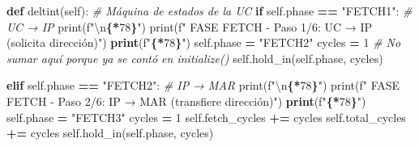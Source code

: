 \documentclass[12pt,oneside]{templates/unerthesis}
\newenvironment{Shaded}{\begin{snugshade}}{\end{snugshade}}
\newcommand{\BuiltInTok}[1]{#1}
\newcommand{\CharTok}[1]{\textcolor[rgb]{0.31,0.60,0.02}{#1}}
\newcommand{\CommentTok}[1]{\textcolor[rgb]{0.56,0.35,0.01}{\textit{#1}}}
\newcommand{\ControlFlowTok}[1]{\textcolor[rgb]{0.13,0.29,0.53}{\textbf{#1}}}
\newcommand{\DecValTok}[1]{\textcolor[rgb]{0.00,0.00,0.81}{#1}}
\newcommand{\ErrorTok}[1]{\textcolor[rgb]{0.64,0.00,0.00}{\textbf{#1}}}
\newcommand{\KeywordTok}[1]{\textcolor[rgb]{0.13,0.29,0.53}{\textbf{#1}}}
\newcommand{\NormalTok}[1]{#1}
\newcommand{\OperatorTok}[1]{\textcolor[rgb]{0.81,0.36,0.00}{\textbf{#1}}}
\newcommand{\SpecialCharTok}[1]{\textcolor[rgb]{0.81,0.36,0.00}{\textbf{#1}}}
\newcommand{\SpecialStringTok}[1]{\textcolor[rgb]{0.31,0.60,0.02}{#1}}
\newcommand{\StringTok}[1]{\textcolor[rgb]{0.31,0.60,0.02}{#1}}
\newcommand{\VariableTok}[1]{\textcolor[rgb]{0.00,0.00,0.00}{#1}}
\begin{document}
\begin{Shaded}
\begin{Highlighting}[]
    \KeywordTok{def}\NormalTok{ deltint(}\VariableTok{self}\NormalTok{):}
        \CommentTok{\# Máquina de estados de la UC}
        \ControlFlowTok{if} \VariableTok{self}\NormalTok{.phase }\OperatorTok{==} \StringTok{"FETCH1"}\NormalTok{:  }\CommentTok{\# UC → IP}
            \BuiltInTok{print}\NormalTok{(}\SpecialStringTok{f"}\CharTok{\textbackslash{}n}\SpecialCharTok{\{}\StringTok{\textquotesingle{}{-}\textquotesingle{}}\OperatorTok{*}\DecValTok{78}\SpecialCharTok{\}}\SpecialStringTok{"}\NormalTok{)}
            \BuiltInTok{print}\NormalTok{(}\SpecialStringTok{f"  FASE FETCH {-} Paso 1/6: UC → IP }
\ErrorTok{            }\NormalTok{(solicita dirección)}\StringTok{")}
\ErrorTok{            print}\NormalTok{(}\SpecialStringTok{f"}\SpecialCharTok{\{}\StringTok{\textquotesingle{}{-}\textquotesingle{}}\OperatorTok{*}\DecValTok{78}\SpecialCharTok{\}}\SpecialStringTok{"}\NormalTok{)}
            \VariableTok{self}\NormalTok{.phase }\OperatorTok{=} \StringTok{"FETCH2"}
\NormalTok{            cycles }\OperatorTok{=} \DecValTok{1}
            \CommentTok{\# No sumar aquí porque ya se contó en initialize()}
            \VariableTok{self}\NormalTok{.hold\_in(}\VariableTok{self}\NormalTok{.phase, cycles)}
        
        \ControlFlowTok{elif} \VariableTok{self}\NormalTok{.phase }\OperatorTok{==} \StringTok{"FETCH2"}\NormalTok{:  }\CommentTok{\# IP → MAR}
            \BuiltInTok{print}\NormalTok{(}\SpecialStringTok{f"}\CharTok{\textbackslash{}n}\SpecialCharTok{\{}\StringTok{\textquotesingle{}{-}\textquotesingle{}}\OperatorTok{*}\DecValTok{78}\SpecialCharTok{\}}\SpecialStringTok{"}\NormalTok{)}
            \BuiltInTok{print}\NormalTok{(}\SpecialStringTok{f"  FASE FETCH {-} Paso 2/6: IP → MAR }
\ErrorTok{            }\NormalTok{(transfiere dirección)}\StringTok{")}
\ErrorTok{            print}\NormalTok{(}\SpecialStringTok{f"}\SpecialCharTok{\{}\StringTok{\textquotesingle{}{-}\textquotesingle{}}\OperatorTok{*}\DecValTok{78}\SpecialCharTok{\}}\SpecialStringTok{"}\NormalTok{)}
            \VariableTok{self}\NormalTok{.phase }\OperatorTok{=} \StringTok{"FETCH3"}
\NormalTok{            cycles }\OperatorTok{=} \DecValTok{1}
            \VariableTok{self}\NormalTok{.fetch\_cycles }\OperatorTok{+=}\NormalTok{ cycles}
            \VariableTok{self}\NormalTok{.total\_cycles }\OperatorTok{+=}\NormalTok{ cycles}
            \VariableTok{self}\NormalTok{.hold\_in(}\VariableTok{self}\NormalTok{.phase, cycles)}
        

\end{Highlighting}
\end{Shaded}
\end{document}
